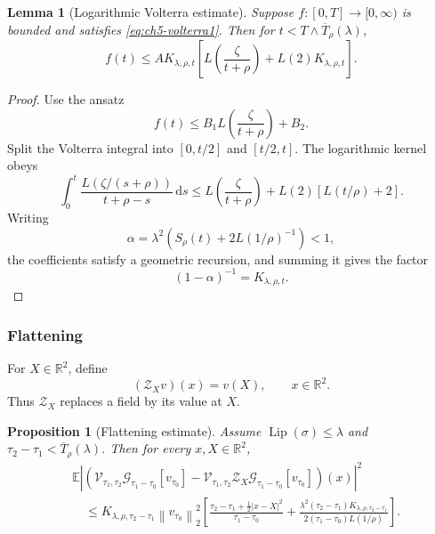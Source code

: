 \documentclass[11pt]{article}
\newtheorem{proposition}[theorem]{Proposition}
\newtheorem{lemma}[theorem]{Lemma}
\theoremstyle{definition}
\theoremstyle{remark}
\newcommand{\R}{\mathbb{R}}
\newcommand{\E}{\mathbb{E}}
\newcommand{\Lip}{\operatorname{Lip}}
\newcommand{\dd}{\,\mathrm{d}}
\newcommand{\norm}[1]{\left\lVert #1\right\rVert}
\newcommand{\abs}[1]{\left\lvert #1\right\rvert}
\newcommand{\hsemig}[2]{\mathcal{G}_{#1}\left[{#2}\right]}
\newcommand{\V}{\mathcal{V}}
\newcommand{\Zop}{\mathcal{Z}}
\newcommand{\Srho}{S_{\rho}}
\begin{document}
\begin{lemma}[Logarithmic Volterra estimate]\label{lem:ch5-volterra}
Suppose \(f:[0,T]\to[0,\infty)\) is bounded and satisfies \eqref{eq:ch5-volterra1}. Then for
\(t<T\wedge\overline T_{\rho}(\lambda)\),
\begin{equation}\label{eq:ch5-volterra-result}
f(t)
\le A K_{\lambda,\rho,t}
\left[
L\!\left(\frac{\zeta}{t+\rho}\right)
+L(2)K_{\lambda,\rho,t}
\right].
\end{equation}
\end{lemma}

\begin{proof}
Use the ansatz
\[
f(t)\le B_1L\!\left(\frac{\zeta}{t+\rho}\right)+B_2.
\]
Split the Volterra integral into \([0,t/2]\) and \([t/2,t]\). The logarithmic kernel obeys
\[
\int_0^t
\frac{L(\zeta/(s+\rho))}{t+\rho-s}\dd s
\le
L\!\left(\frac{\zeta}{t+\rho}\right)
+L(2)[L(t/\rho)+2].
\]
Writing
\[
\alpha=\lambda^2\left(\Srho(t)+2L(1/\rho)^{-1}\right)<1,
\]
the coefficients satisfy a geometric recursion, and summing it gives the factor
\[
(1-\alpha)^{-1}=K_{\lambda,\rho,t}.
\]
\end{proof}

\subsubsection{Flattening}

For \(X\in\R^2\), define
\begin{equation}\label{eq:ch5-Z}
(\Zop_Xv)(x)=v(X),\qquad x\in\R^2.
\end{equation}
Thus \(\Zop_X\) replaces a field by its value at \(X\).

\begin{proposition}[Flattening estimate]\label{prop:ch5-flatten}
Assume \(\Lip(\sigma)\le\lambda\) and
\(\tau_2-\tau_1<\overline T_{\rho}(\lambda)\). Then for every \(x,X\in\R^2\),
\begin{align}\label{eq:ch5-flatten-bound}
&\E\abs{
\left(\V_{\tau_1,\tau_2}\hsemig{\tau_1-\tau_0}{v_{\tau_0}}
-\V_{\tau_1,\tau_2}\Zop_X\hsemig{\tau_1-\tau_0}{v_{\tau_0}}\right)(x)}^2
\\
&\quad\le
K_{\lambda,\rho,\tau_2-\tau_1}\norm{v_{\tau_0}}_2^2
\left[
\frac{\tau_2-\tau_1+\frac12|x-X|^2}{\tau_1-\tau_0}
+\frac{\lambda^2(\tau_2-\tau_1)K_{\lambda,\rho,\tau_2-\tau_1}}
{2(\tau_1-\tau_0)L(1/\rho)}
\right].
\end{align}
\end{proposition}
\end{document}
